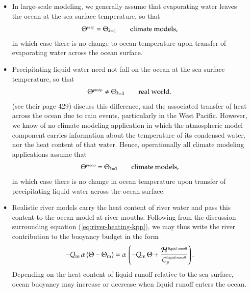   \begin{itemize}

  \item In large-scale modeling, we generally assume that evaporating
    water leaves the ocean at the sea surface temperature, so that
\begin{equation}
   \Theta^{\mbox{\tiny evap}} = \Theta_{k=1} \qquad \mbox{climate models},
\end{equation}
in which case there is no change to ocean temperature upon transfer of
evaporating water across the ocean surface. 

\item Precipitating liquid water need not fall on the ocean at the sea
  surface temperature, so that
\begin{equation}
   \Theta^{\mbox{\tiny precip}} \ne \Theta_{k=1} \qquad \mbox{real world}.
\end{equation}
\cite{KanthaClaysonII} (see their page 429) discuss this difference,
and the associated transfer of heat across the ocean due to rain
events, particularly in the West Pacific.  However, we know of no
climate modeling application in which the atmospheric model component
carries information about the temperature of its condensed water, nor
the heat content of that water.  Hence, operationally all climate
modeling applications assume that
\begin{equation}
   \Theta^{\mbox{\tiny precip}} = \Theta_{k=1} \qquad \mbox{climate models},
\end{equation}
in which case there is no change in ocean temperature upon transfer of
precipitating liquid water across the ocean surface.

\item Realistic river models carry the heat content of river water and
  pass this content to the ocean model at river mouths.  Following
  from the discussion surrounding equation
  (\ref{eq:river-heating-kpp}), we may thus write the river
  contribution to the buoyancy budget in the form
\begin{equation}
 -Q_{\mbox{\scriptsize m}} \, \alpha \, (\Theta - \Theta_{\mbox{\scriptsize m}}) = \alpha \, \left(
  -Q_{\mbox{\scriptsize m}} \, \Theta  + \frac{  {\cal H}^{\mbox{\tiny liquid runoff}} }  {C_{p}^{\mbox{\tiny liquid runoff}}} \right).
\end{equation}
Depending on the heat content of liquid runoff relative to the sea
surface, ocean buoyancy may increase or decrease when liquid runoff
enters the ocean.

\end{itemize}


